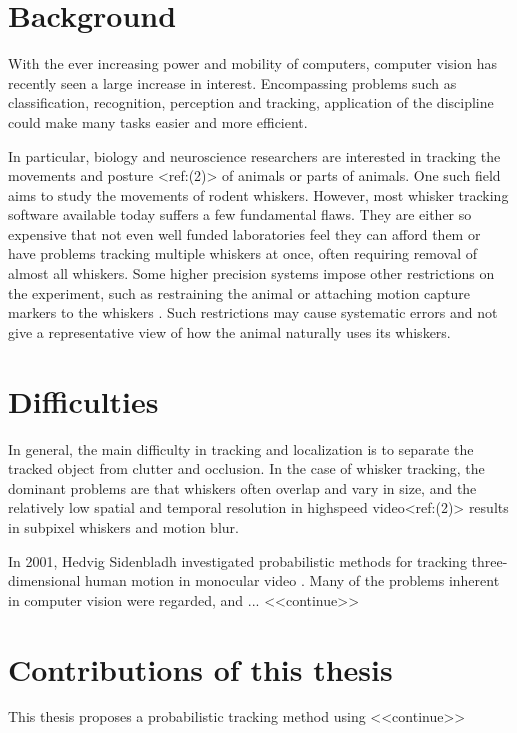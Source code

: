 \section{Background}





With the ever increasing power and mobility of computers, computer vision has recently seen a large increase in interest. 
Encompassing problems such as classification, recognition, perception and tracking, application of the discipline could make many tasks easier and more efficient.

In particular, biology and neuroscience researchers are interested in tracking the movements and posture <ref:(2)> of animals or parts of animals.
One such field aims to study the movements of rodent whiskers. However, most whisker tracking software available today suffers a few fundamental flaws.
They are either so expensive that not even well funded laboratories feel they can afford them or have problems tracking multiple whiskers at once, often requiring removal of almost all whiskers. 
Some higher precision systems impose other restrictions on the experiment, such as restraining the animal or attaching motion 
capture markers to the whiskers \cite{BadExample1}. Such restrictions may cause systematic errors and not give 
a representative view of how the animal naturally uses its whiskers.

\section{Difficulties}
In general, the main difficulty in tracking and localization is to separate the tracked object from clutter
and occlusion. In the case of whisker tracking, the dominant problems are that whiskers often overlap and vary in size, 
and the relatively low spatial and temporal resolution in highspeed video<ref:(2)> results in subpixel whiskers and motion blur.

In 2001, Hedvig Sidenbladh investigated probabilistic methods for tracking three-dimensional human motion in monocular video \cite{Hedvig}. 
Many of the problems inherent in computer vision were regarded, and ... <<continue>>

\section{Contributions of this thesis}

This thesis proposes a probabilistic tracking method using 
<<continue>>
